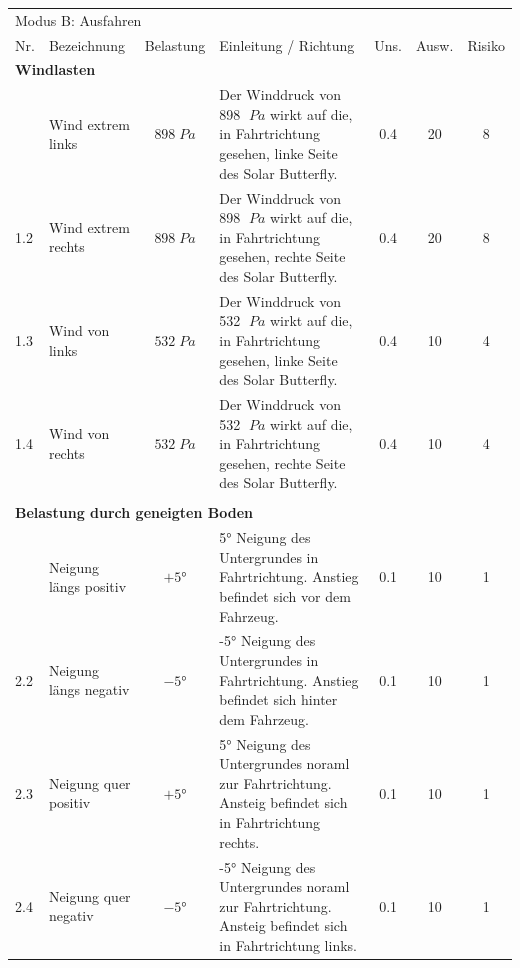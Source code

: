 \begin{landscape}%
  \centering %
  \begin{tabularx}{\linewidth}{llcXccc}
    \multicolumn{7}{l}{\LARGE{Modus B: Ausfahren}}\\
    \thickhline
    Nr. & Bezeichnung & Belastung & Einleitung / Richtung & Uns. & Ausw. & Risiko\\
    \hline
    \multicolumn{7}{l}{\textbf{Windlasten}}\\
    \thickhline
    1.1 & Wind extrem links   & $898 \; Pa$ & Der Winddruck von 898 $\; Pa$ wirkt auf die, in Fahrtrichtung gesehen, linke Seite des Solar Butterfly. %
    & 0.4 & 20 & 8\\
    1.2 & Wind extrem rechts  & $898 \; Pa$ & Der Winddruck von 898 $\; Pa$ wirkt auf die, in Fahrtrichtung gesehen, rechte Seite des Solar Butterfly. %
    & 0.4 & 20 & 8\\
    1.3 & Wind von links      & $532 \; Pa$ & Der Winddruck von 532 $\; Pa$ wirkt auf die, in Fahrtrichtung gesehen, linke Seite des Solar Butterfly. %
    & 0.4 & 10 & 4\\
    1.4 & Wind von rechts     & $532 \; Pa$ & Der Winddruck von 532 $\; Pa$ wirkt auf die, in Fahrtrichtung gesehen, rechte Seite des Solar Butterfly. %
    & 0.4 & 10 & 4\\
    \\[\lineHeightTable]

    \multicolumn{7}{l}{\textbf{Belastung durch geneigten Boden}}\\
    \thickhline
    2.1	& Neigung längs positiv & $+5$° & 5° Neigung des Untergrundes in Fahrtrichtung. Anstieg befindet sich vor dem Fahrzeug. & 0.1 & 10 & 1\\
    2.2	& Neigung längs negativ & $-5$° & -5° Neigung des Untergrundes in Fahrtrichtung. Anstieg befindet sich hinter dem Fahrzeug. & 0.1 & 10 & 1\\
    2.3	& Neigung quer positiv  & $+5$° & 5° Neigung des Untergrundes noraml zur Fahrtrichtung. Ansteig befindet sich in Fahrtrichtung rechts. & 0.1 & 10 & 1\\
    2.4	& Neigung quer negativ  & $-5$° & -5° Neigung des Untergrundes noraml zur Fahrtrichtung. Ansteig befindet sich in Fahrtrichtung links. & 0.1 & 10 & 1\\


\end{tabularx}
\end{landscape}
